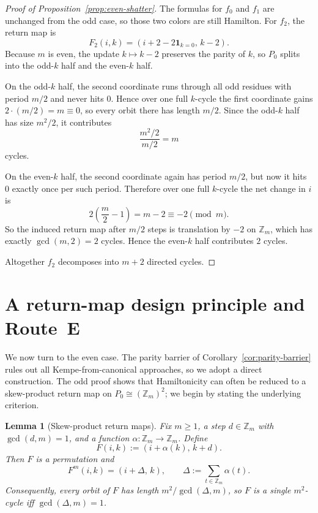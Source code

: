 \documentclass[11pt]{article}
\newtheorem{lemma}{Lemma}
\begin{document}
\begin{proof}[Proof of Proposition~\ref{prop:even-shatter}]
The formulas for $f_0$ and $f_1$ are unchanged from the odd case, so those two colors are still Hamilton.
For $f_2$, the return map is
\[
F_2(i,k)=(i+2-2\mathbf 1_{k=0},\,k-2).
\]
Because $m$ is even, the update $k\mapsto k-2$ preserves the parity of $k$, so $P_0$ splits into the odd-$k$ half and the even-$k$ half.

On the odd-$k$ half, the second coordinate runs through all odd residues with period $m/2$ and never hits $0$.
Hence over one full $k$-cycle the first coordinate gains $2\cdot(m/2)=m\equiv 0$, so every orbit there has length $m/2$.
Since the odd-$k$ half has size $m^2/2$, it contributes
\[
\frac{m^2/2}{m/2}=m
\]
cycles.

On the even-$k$ half, the second coordinate again has period $m/2$, but now it hits $0$ exactly once per such period.
Therefore over one full $k$-cycle the net change in $i$ is
\[
2\left(\frac m2-1\right)=m-2\equiv -2 \pmod m.
\]
So the induced return map after $m/2$ steps is translation by $-2$ on $\mathbb Z_m$, which has exactly $\gcd(m,2)=2$ cycles.
Hence the even-$k$ half contributes $2$ cycles.

Altogether $f_2$ decomposes into $m+2$ directed cycles.
\end{proof}


\section{A return-map design principle and Route~E}\label{sec:even}

We now turn to the even case.
The parity barrier of Corollary~\ref{cor:parity-barrier} rules out all Kempe-from-canonical approaches, so we adopt a direct construction.
The odd proof shows that Hamiltonicity can often be reduced to a skew-product return map on $P_0\cong (\mathbb Z_m)^2$; we begin by stating the underlying criterion.

\begin{lemma}[Skew-product return maps]\label{lem:skew-product}
Fix $m\ge 1$, a step $d\in \mathbb Z_m$ with $\gcd(d,m)=1$, and a function $\alpha:\mathbb Z_m\to\mathbb Z_m$.
Define
\[
F(i,k):=(i+\alpha(k),\,k+d).
\]
Then $F$ is a permutation and
\[
F^m(i,k)=(i+\Delta,\,k),\qquad \Delta:=\sum_{t\in\mathbb Z_m}\alpha(t).
\]
Consequently, every orbit of $F$ has length $m^2/\gcd(\Delta,m)$, so $F$ is a single $m^2$-cycle iff $\gcd(\Delta,m)=1$.
\end{lemma}
\end{document}
